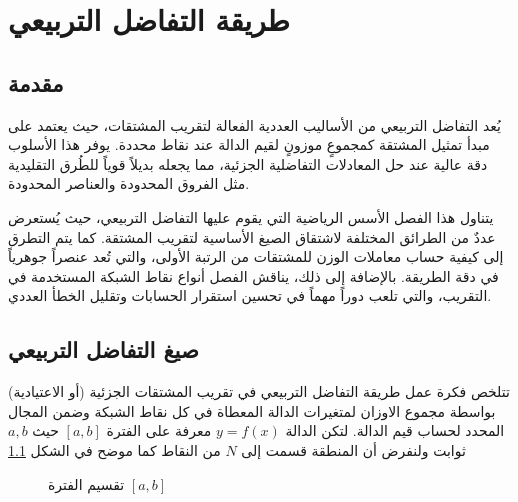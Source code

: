 \chapter{طريقة التفاضل التربيعي}
	\pagestyle{fancy}
\section[مقدمة]{مقدمة }

يُعد التفاضل التربيعي   من الأساليب العددية الفعالة لتقريب المشتقات، حيث يعتمد على مبدأ تمثيل المشتقة كمجموعٍ موزونٍ لقيم الدالة عند نقاط محددة. يوفر هذا الأسلوب دقة عالية عند حل المعادلات التفاضلية الجزئية، مما يجعله بديلاً قوياً للطُرق التقليدية مثل الفروق المحدودة والعناصر المحدودة.

يتناول هذا الفصل الأسس الرياضية التي يقوم عليها التفاضل التربيعي، حيث يُستعرض عددٌ من الطرائق المختلفة لاشتقاق الصيغ الأساسية لتقريب المشتقة. كما يتم التطرق إلى كيفية حساب معاملات الوزن للمشتقات من الرتبة الأولى، والتي تُعد عنصراً جوهرياً في دقة الطريقة. بالإضافة إلى ذلك، يناقش الفصل أنواع نقاط الشبكة المستخدمة في التقريب، والتي تلعب دوراً مهماً في تحسين استقرار الحسابات وتقليل الخطأ العددي.

\section[صيغ التفاضل التربيعي]{صيغ التفاضل التربيعي }

تتلخص فكرة عمل طريقة التفاضل التربيعي في تقريب المشتقات الجزئية (أو الاعتيادية) بواسطة مجموع الاوزان لمتغيرات الدالة المعطاة في كل نقاط الشبكة وضمن المجال المحدد لحساب قيم الدالة. لتكن الدالة $y=f(x)$ معرفة على الفترة $[a,b]$ حيث $a,b$ ثوابت ولنفرض أن المنطقة قسمت إلى $N$ من النقاط كما موضح في الشكل \ref{fig:numberline}\cite{chang_shu}

\begin{figure}[H]
	\centering
	
	\caption{تقسيم الفترة $[a,b]$}
	\label{fig:numberline}
\end{figure}

